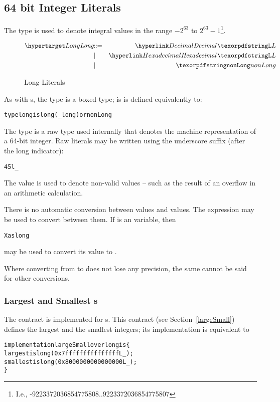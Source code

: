 \subsection{64 bit Integer Literals}
\label{longType}

The  type is used to denote integral values in the range $-2^{63} \mbox{ to } 2^{63}-1$\footnote{I.e., -9223372036854775808..{}9223372036854775807}. 

\begin{figure}[htbp]
\begin{eqnarray*}
\ntDef{Long}&\arrow&\ntRef{Decimal}\,\q{L}\\
&\choice&\ntRef{Hexadecimal}\,\q{L}\\
&\choice&\q{nonLong}
\end{eqnarray*}
\caption{Long Literals}
\label{longExpressionFig}
\end{figure}

As with s, the  type is a boxed type; is is defined equivalently to:
\begin{alltt}
type long is long(_long) or nonLong
\end{alltt}
The  type is a raw type used internally that denotes the machine representation of a 64-bit integer. Raw  literals may be written using the underscore suffix (after the long indicator):
\begin{alltt}
45l\_
\end{alltt}

The  value is used to denote non-valid  values -- such as the result of an overflow in an arithmetic calculation.

\begin{aside}
There is no automatic conversion between  values and  values. The  expression may be used to convert between them. If  is an  variable, then
\begin{alltt}
X as long
\end{alltt}
may be used to convert its value to .
\begin{aside}
Where converting from  to  does not lose any precision, the same cannot be said for other conversions.
\end{aside}
\end{aside}

\subsubsection{Largest and Smallest s}
The  contract is implemented for s. This contract (see Section~\vref{largeSmall}) defines the largest and the smallest  integers; its implementation is equivalent to
\begin{alltt}
implementation largeSmall over long is \{
  largest is long(0x7fffffffffffffffL\_);
  smallest is long(0x8000000000000000L\_);
\}
\end{alltt}


